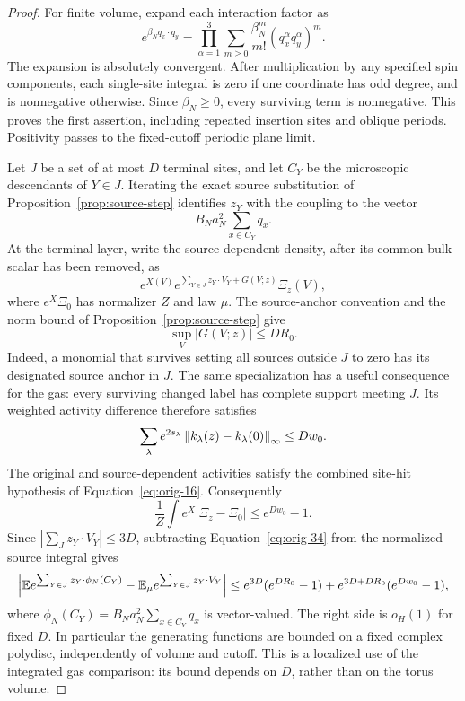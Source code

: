 \begin{proof}
For finite volume, expand each interaction factor as
\[
 e^{\beta_N q_x\cdot q_y}
   =\prod_{\alpha=1}^3\sum_{m\ge0}
       \frac{\beta_N^m}{m!}(q_x^\alpha q_y^\alpha)^m.
\]
The expansion is absolutely convergent.  After multiplication by any
specified spin components, each single-site integral is zero if one
coordinate has odd degree, and is nonnegative otherwise.  Since
$\beta_N\ge0$, every surviving term is nonnegative.  This proves the
first assertion, including repeated insertion sites and oblique
periods.  Positivity passes to the fixed-cutoff periodic plane limit.

Let $J$ be a set of at most $D$ terminal sites, and let $C_Y$ be the
microscopic descendants of $Y\in J$.  Iterating the exact source
substitution of Proposition~\ref{prop:source-step} identifies $z_Y$ with
the coupling to the vector
\[
       B_Na_N^2\sum_{x\in C_Y}q_x.
\]
At the terminal layer, write the source-dependent density, after its
common bulk scalar has been removed, as
\[
 e^{X(V)}
 e^{\sum_{Y\in J}z_Y\cdot V_Y+G(V;z)}\Xi_z(V),
\]
where $e^X\Xi_0$ has normalizer $Z$ and law $\mu$.  The source-anchor
convention and the norm bound of Proposition~\ref{prop:source-step}
give
\[
       \sup_V|G(V;z)|\le DR_0.
\]
Indeed, a monomial that survives setting all sources outside $J$ to
zero has its designated source anchor in $J$.  The same specialization
has a useful consequence for the gas: every surviving changed label
has complete support meeting $J$.  Its weighted activity difference
therefore satisfies
\[
 \sum_\lambda e^{2s_\lambda}
            \left\lVert k_\lambda(z)-k_\lambda(0)\right\rVert_\infty
       \le Dw_0.
\]
The original and source-dependent activities satisfy the combined
site-hit hypothesis of Equation~\eqref{eq:orig-16}.  Consequently
\[
 \frac1Z\int e^X|\Xi_z-\Xi_0|
      \le e^{Dw_0}-1.
\]
Since $|\sum_{J}z_Y\cdot V_Y|\le3D$, subtracting
Equation~\eqref{eq:orig-34} from the normalized source integral gives
\begin{equation}
 \left|\mathbb E e^{\sum_{Y\in J}z_Y\cdot\phi_N(C_Y)}
       -\mathbb E_\mu e^{\sum_{Y\in J}z_Y\cdot V_Y}\right|
 \le e^{3D}(e^{DR_0}-1)
      +e^{3D+DR_0}(e^{Dw_0}-1),
 \label{eq:localized-source-comparison}
\end{equation}
where $\phi_N(C_Y)=B_Na_N^2\sum_{x\in C_Y}q_x$ is vector-valued.
The right side is $o_H(1)$ for fixed $D$.  In particular the generating
functions are bounded on a fixed complex polydisc, independently of
volume and cutoff.  This is a localized use of the integrated gas
comparison: its bound depends on $D$, rather than on the torus volume.


\end{proof}
